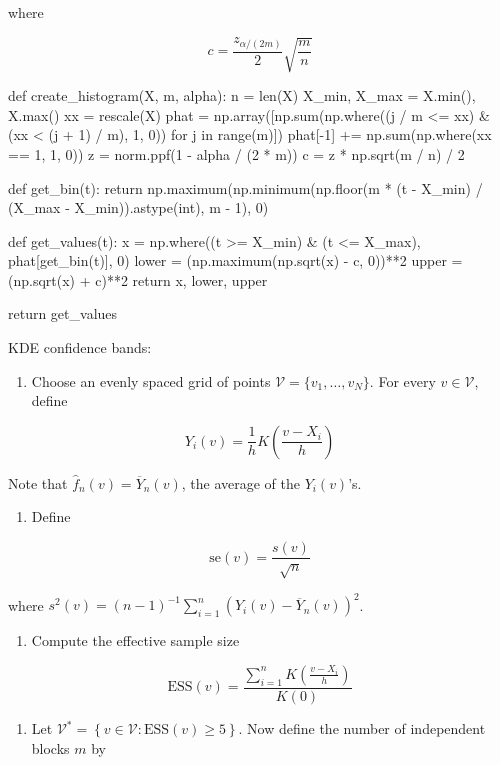 where

\[
c = \frac{z_{\alpha / (2 m)}}{2} \sqrt{\frac{m}{n}}
\]

\begin{python}
def create_histogram(X, m, alpha):
    n = len(X)
    X_min, X_max = X.min(), X.max()
    xx = rescale(X)
    phat = np.array([np.sum(np.where((j / m <= xx) & (xx < (j + 1) / m), 1, 0)) for j in range(m)])
    phat[-1] += np.sum(np.where(xx == 1, 1, 0))
    z = norm.ppf(1 - alpha / (2 * m))
    c = z * np.sqrt(m / n) / 2
    
    def get_bin(t):
        return np.maximum(np.minimum(np.floor(m * (t - X_min) / (X_max - X_min)).astype(int), m - 1), 0)
    
    def get_values(t):
        x = np.where((t >= X_min) & (t <= X_max), phat[get_bin(t)], 0)
        lower = (np.maximum(np.sqrt(x) - c, 0))**2
        upper = (np.sqrt(x) + c)**2
        return x, lower, upper
    
    return get_values
\end{python}

KDE confidence bands:

\begin{enumerate}[tightlist,label={\arabic*.}]
\item
  Choose an evenly spaced grid of points
  \(\mathcal{V} = \{ v_1, \dots, v_N \}\). For every
  \(v \in \mathcal{V}\), define
\end{enumerate}

\[ Y_i(v) = \frac{1}{h} K \left( \frac{v - X_i}{h} \right) \]

Note that \(\hat{f}_n(v) = \overline{Y}_n(v)\), the average of the
\(Y_i(v)\)'s.

\begin{enumerate}[tightlist,label={\arabic*.}]
\item
  Define
\end{enumerate}

\[ \text{se}(v) = \frac{s(v)}{\sqrt{n}} \]

where
\(s^2(v) = (n - 1)^{-1} \sum_{i=1}^n ( Y_i(v) - \overline{Y}_n(v) )^2\).

\begin{enumerate}[tightlist,label={\arabic*.},resume]
\item
  Compute the effective sample size
\end{enumerate}

\[ \text{ESS}(v) = \frac{\sum_{i=1}^n K\left( \frac{v - X_i}{h} \right)}{K(0)} \]

\begin{enumerate}[tightlist,label={\arabic*.},resume]
\item
  Let
  \(\mathcal{V}^* = \left\{ v \in \mathcal{V} : \text{ESS}(v) \geq 5 \right\}\).
  Now define the number of independent blocks \(m\) by
\end{enumerate}


